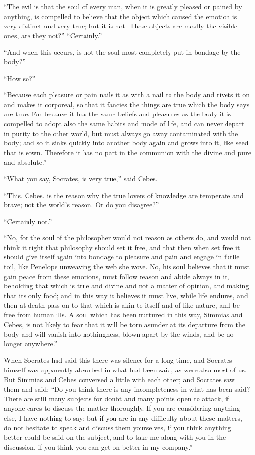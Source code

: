 \documentclass[letterpaper,12pt]{article}
\newcommand{\stephpag}[1]{\marginnote{\small\itshape\fontfamily{ppl}\selectfont #1}}
\begin{document}
\begin{drama}
``The evil is that the soul of every man, when it is greatly pleased or pained by anything, is compelled to believe that the object which caused the emotion is very distinct and very true; but it is not. These objects are mostly the visible ones, are they not?'' \stephpag{d} ``Certainly.''
 
``And when this occurs, is not the soul most completely put in bondage by the body?''
 
``How so?''
 
``Because each pleasure or pain nails it as with a nail to the body and rivets it on and makes it corporeal, so that it fancies the things are true which the body says are true. For because it has the same beliefs and pleasures as the body it is compelled to adopt also the same habits and mode of life, and can never depart in purity to the other world, but must always go away contaminated with the body; and so it sinks quickly into another body again and grows into it, \stephpag{e} like seed that is sown. Therefore it has no part in the communion with the divine and pure and absolute.''
 
``What you say, Socrates, is very true,'' said Cebes.
 
``This, Cebes, is the reason why the true lovers of knowledge are temperate and brave; not the world's reason. \stephpag{84 a} Or do you disagree?''
 
``Certainly not.''
 
``No, for the soul of the philosopher would not reason as others do, and would not think it right that philosophy should set it free, and that then when set free it should give itself again into bondage to pleasure and pain and engage in futile toil, like Penelope unweaving the web she wove. No, his soul believes that it must gain peace from these emotions, must follow reason and abide always in it, beholding that which is true and divine and not a matter of opinion, and making that its only food; \stephpag{b} and in this way it believes it must live, while life endures, and then at death pass on to that which is akin to itself and of like nature, and be free from human ills. A soul which has been nurtured in this way, Simmias and Cebes, is not likely to fear that it will be torn asunder at its departure from the body and will vanish into nothingness, blown apart by the winds, and be no longer anywhere.''
 
When Socrates had said this there was silence \stephpag{c} for a long time, and Socrates himself was apparently absorbed in what had been said, as were also most of us. But Simmias and Cebes conversed a little with each other; and Socrates saw them and said: ``Do you think there is any incompleteness in what has been said? There are still many subjects for doubt and many points open to attack, if anyone cares to discuss the matter thoroughly. If you are considering anything else, I have nothing to say; but if you are in any difficulty about these matters, do not hesitate \stephpag{d} to speak and discuss them yourselves, if you think anything better could be said on the subject, and to take me along with you in the discussion, if you think you can get on better in my company.''
 

\end{drama}
\end{document}
